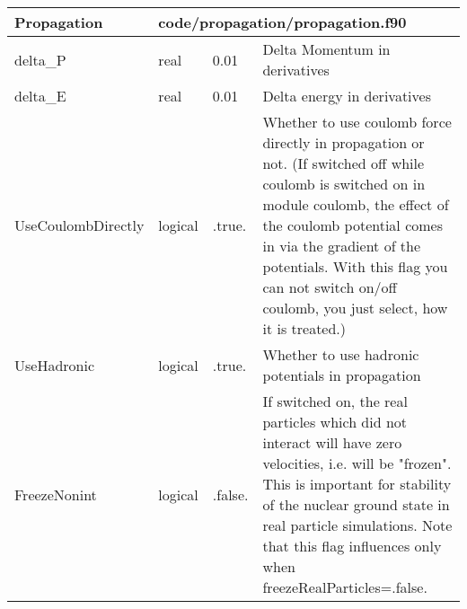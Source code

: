 \documentclass{article}
\begin{document}

\begin{longtable}{llll}
\toprule
\textbf{\large{Propagation}} & \multicolumn{3}{l}{\footnotesize{code/propagation/propagation.f90}}\\*
\midrule
\endfirsthead
\midrule
\endhead
delta\_P & \begin{minipage}[t]{2cm}real\end{minipage} & \begin{minipage}[t]{2cm}0.01\end{minipage} & \begin{minipage}[t]{12cm}Delta Momentum in derivatives\end{minipage}\\*
\midrule
delta\_E & \begin{minipage}[t]{2cm}real\end{minipage} & \begin{minipage}[t]{2cm}0.01\end{minipage} & \begin{minipage}[t]{12cm}Delta energy in derivatives\end{minipage}\\*
\midrule
UseCoulombDirectly & \begin{minipage}[t]{2cm}logical\end{minipage} & \begin{minipage}[t]{2cm}.true.\end{minipage} & \begin{minipage}[t]{12cm}Whether to use coulomb force directly in propagation or not. (If switched off while coulomb is switched on in module coulomb, the effect of the coulomb potential comes in via the gradient of the potentials. With this flag you can not switch on/off coulomb, you just select, how it is treated.)\end{minipage}\\*
\midrule
UseHadronic & \begin{minipage}[t]{2cm}logical\end{minipage} & \begin{minipage}[t]{2cm}.true.\end{minipage} & \begin{minipage}[t]{12cm}Whether to use hadronic potentials in propagation\end{minipage}\\*
\midrule
FreezeNonint & \begin{minipage}[t]{2cm}logical\end{minipage} & \begin{minipage}[t]{2cm}.false.\end{minipage} & \begin{minipage}[t]{12cm}If switched on, the real particles which did not interact will have zero velocities, i.e. will be "frozen". This is important for stability of the nuclear ground state in real particle simulations. Note that this flag influences only when freezeRealParticles=.false.\end{minipage}\\*

\end{longtable}
\end{document}
